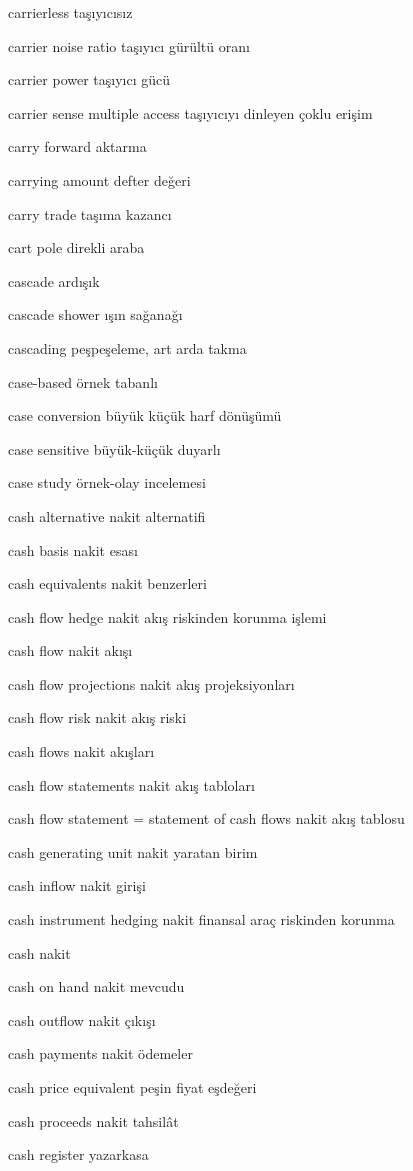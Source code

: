\documentclass[12pt,fleqn]{article}\usepackage{../../common}
\begin{document}
carrierless taşıyıcısız

carrier noise ratio taşıyıcı gürültü oranı

carrier power taşıyıcı gücü

carrier sense multiple access taşıyıcıyı dinleyen çoklu erişim

carry forward aktarma

carrying amount defter değeri

carry trade taşıma kazancı

cart pole direkli araba

cascade ardışık

cascade shower ışın sağanağı

cascading peşpeşeleme, art arda takma

case-based örnek tabanlı

case conversion büyük küçük harf dönüşümü

case sensitive büyük-küçük duyarlı

case study örnek-olay incelemesi

cash alternative nakit alternatifi

cash basis nakit esası

cash equivalents nakit benzerleri

cash flow hedge nakit akış riskinden korunma işlemi

cash flow nakit akışı

cash flow projections nakit akış projeksiyonları

cash flow risk nakit akış riski

cash flows nakit akışları

cash flow statements nakit akış tabloları

cash flow statement = statement of cash flows nakit akış tablosu

cash generating unit nakit yaratan birim

cash inflow nakit girişi

cash instrument hedging nakit finansal araç riskinden korunma

cash nakit

cash on hand nakit mevcudu

cash outflow nakit çıkışı

cash payments nakit ödemeler

cash price equivalent peşin fiyat eşdeğeri

cash proceeds nakit tahsilât

cash register yazarkasa
\end{document}
